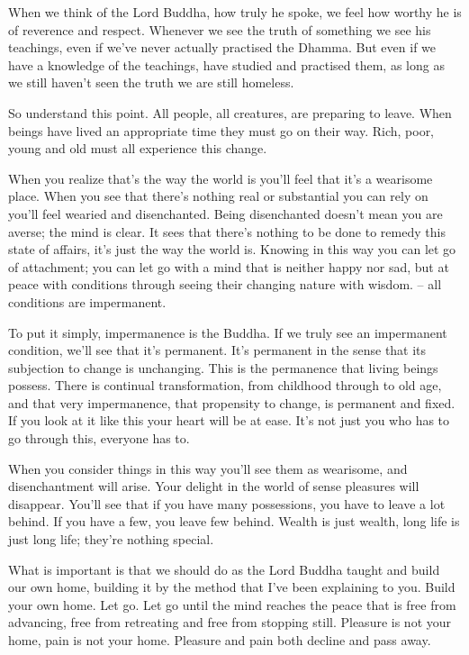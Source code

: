 When we think of the Lord Buddha, how truly he spoke, we feel how worthy he is of reverence and respect. Whenever we see the truth of something we see his teachings, even if we've never actually practised the Dhamma. But even if we have a knowledge of the teachings, have studied and practised them, as long as we still haven't seen the truth we are still homeless. 

So understand this point. All people, all creatures, are preparing to leave. When beings have lived an appropriate time they must go on their way. Rich, poor, young and old must all experience this change. 

When you realize that's the way the world is you'll feel that it's a wearisome place. When you see that there's nothing real or substantial you can rely on you'll feel wearied and disenchanted. Being disenchanted doesn't mean you are averse; the mind is clear. It sees that there's nothing to be done to remedy this state of affairs, it's just the way the world is. Knowing in this way you can let go of attachment; you can let go with a mind that is neither happy nor sad, but at peace with conditions through seeing their changing nature with wisdom.  -- all conditions are impermanent. 

To put it simply, impermanence is the Buddha. If we truly see an impermanent condition, we'll see that it's permanent. It's permanent in the sense that its subjection to change is unchanging. This is the permanence that living beings possess. There is continual transformation, from childhood through to old age, and that very impermanence, that propensity to change, is permanent and fixed. If you look at it like this your heart will be at ease. It's not just you who has to go through this, everyone has to. 

When you consider things in this way you'll see them as wearisome, and disenchantment will arise. Your delight in the world of sense pleasures will disappear. You'll see that if you have many possessions, you have to leave a lot behind. If you have a few, you leave few behind. Wealth is just wealth, long life is just long life; they're nothing special. 

What is important is that we should do as the Lord Buddha taught and build our own home, building it by the method that I've been explaining to you. Build your own home. Let go. Let go until the mind reaches the peace that is free from advancing, free from retreating and free from stopping still. Pleasure is not your home, pain is not your home. Pleasure and pain both decline and pass away. 

